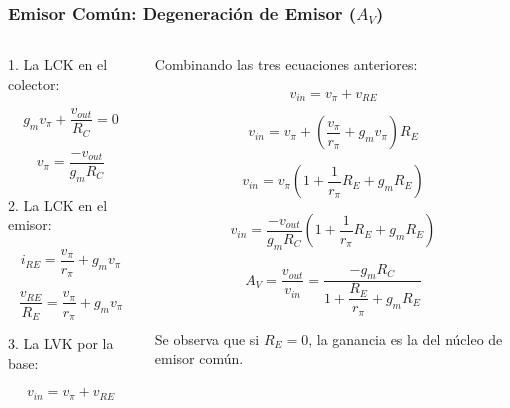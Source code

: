 \begin{frame}[t]
    \frametitle{Emisor Común: Degeneración de Emisor ($A_V$)}

    \begin{columns}
        \begin{column}{0.4\textwidth}
            1. La LCK en el colector:
            
            \[ g_m v_\pi + \dfrac{v_{out}}{R_C} = 0 \]

            \[ v_\pi = \dfrac{-v_{out}}{g_m R_C} \]

            \vspace{5mm}
            2. La LCK en el emisor:

            \[ i_{RE} = \dfrac{v_\pi}{r_\pi} + g_m v_\pi \]

            \[ \dfrac{v_{RE}}{R_E} = \dfrac{v_\pi}{r_\pi} + g_m v_\pi \]

            \vspace{5mm}
            3. La LVK por la base:

            \[ v_{in} = v_\pi + v_{RE} \] 
        \end{column}
        \begin{column}{0.6\textwidth}
            Combinando las tres ecuaciones anteriores:

            \[ v_{in} = v_\pi + v_{RE} \] 

            \[ v_{in} = v_\pi + \left( \dfrac{v_\pi}{r_\pi} + g_m v_\pi \right) R_E \]
            
            \[ v_{in} = v_\pi \left( 1 + \dfrac{1}{r_\pi} R_E + g_m R_E \right) \]

            \[ v_{in} = \dfrac{-v_{out}}{g_m R_C} \left( 1 + \dfrac{1}{r_\pi} R_E + g_m R_E \right) \]

            \[ A_V = \dfrac{v_{out}}{v_{in}} = \dfrac{-g_m R_C}{1 + \dfrac{R_E}{r_\pi} + g_m R_E} \]

            Se observa que si $R_E=0$, la ganancia es la del núcleo de emisor común.
        \end{column}
    \end{columns}
\end{frame}

